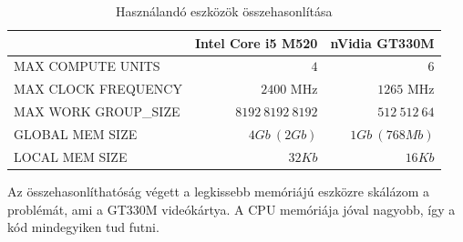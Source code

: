 	\begin{table}[!ht]
	\renewcommand{\arraystretch}{1.3}
	\setlength{\extrarowheight}{8pt}
	\caption{Használandó eszközök összehasonlítása}
	\label{table:envs}
	\centering
	\begin{tabular}{ l | r | r}
		 & Intel Core i5 M520 & nVidia GT330M \\ \hline
		MAX COMPUTE UNITS & $4$ & $6$\\
		MAX CLOCK FREQUENCY & $2400$ MHz & $1265$ MHz \\
		MAX WORK GROUP\_SIZE & $8192\ 8192\ 8192$ & $512\ 512\ 64$ \\ \hline\hline
		GLOBAL MEM SIZE & $4Gb\ (2Gb)$ & $1Gb\ (768 Mb)$\\
		LOCAL MEM SIZE & $32 Kb$ & $16 Kb$\\
	\end{tabular}
	\end{table}
	
	Az összehasonlíthatóság végett a legkissebb memóriájú eszközre skálázom a problémát, ami a
	GT330M videókártya. A CPU memóriája jóval nagyobb, így a kód mindegyiken tud futni.




